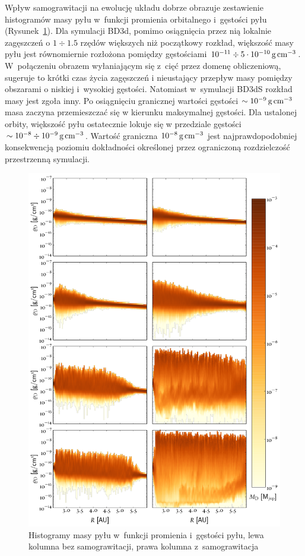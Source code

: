 %
\par Wpływ samograwitacji na ewolucję układu dobrze obrazuje zestawienie
histogramów masy pyłu w~funkcji promienia orbitalnego i~gęstości pyłu
(Rysunek~\ref{fig:hists}). Dla symulacji BD3d, pomimo osiągnięcia przez nią
lokalnie zagęszczeń o $1\div1.5$ rzędów większych niż początkowy rozkład,
większość masy pyłu jest równomiernie rozłożona pomiędzy gęstościami $10^{-11}
\div 5\cdot10^{-10}\hbox{$\thinspace\textrm{g}$}\hbox{$\thinspace\textrm{cm}$}^{-3}$. W~połączeniu obrazem wyłaniającym się z~cięć
przez domenę obliczeniową, sugeruje to krótki czas życia zagęszczeń i
nieustający przepływ masy pomiędzy obszarami o niskiej i~wysokiej gęstości.
Natomiast w~symulacji BD3dS rozkład masy jest zgoła inny. Po osiągnięciu
granicznej wartości gęstości $\sim10^{-9}\hbox{$\thinspace\textrm{g}$}\hbox{$\thinspace\textrm{cm}$}^{-3}$ masa zaczyna przemieszczać
się w kierunku maksymalnej gęstości. Dla ustalonej orbity, większość pyłu
ostatecznie lokuje się w przedziale gęstości $\sim10^{-8}\div10^{-9}\hbox{$\thinspace\textrm{g}$}\hbox{$\thinspace\textrm{cm}$}^{-3}$.
Wartość graniczna $10^{-8}\hbox{$\thinspace\textrm{g}$}\hbox{$\thinspace\textrm{cm}$}^{-3}$ jest najprawdopodobniej konsekwencją
poziomiu dokładności określonej przez ograniczoną rozdzielczość przestrzenną
symulacji.
%
\begin{figure} 
  \centering
  \includegraphics[height=0.9\textheight]{figures/hists2d}
  \caption{Histogramy masy pyłu w~funkcji promienia i~gęstości pyłu, lewa
  kolumna bez samograwitacji, prawa kolumna z~samograwitacja}
  \label{fig:hists} 
\end{figure}
